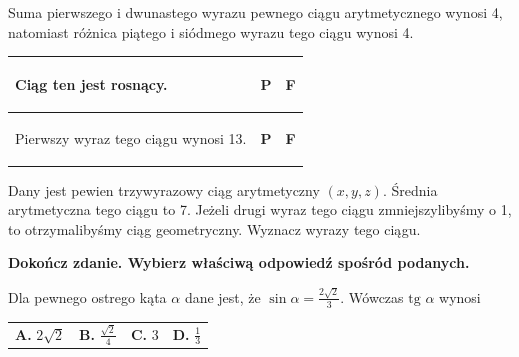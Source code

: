 \documentclass[12pt,a4paper]{article}
\theoremstyle{break}
\begin{document}
	Suma pierwszego i dwunastego wyrazu pewnego ciągu arytmetycznego wynosi 4, natomiast różnica piątego i siódmego wyrazu tego ciągu wynosi 4.
	
	\vspace{0.5cm}
	\begin{tabular}{|p{12.5cm}|p{1cm}|p{1cm}|}
		
		\hline
		\begin{flushleft}
			Ciąg ten jest rosnący.
		\end{flushleft}&\begin{center}
			\textbf{P}
		\end{center}&\begin{center}
			\textbf{F}
		\end{center}\\
		\hline
		\begin{flushleft}
			Pierwszy wyraz tego ciągu wynosi 13.
		\end{flushleft}&\begin{center}
			\textbf{P}
		\end{center}&\begin{center}
			\textbf{F}
		\end{center}\\
		\hline
	\end{tabular}
	
	\begin{zad}[0-4]
		Dany jest pewien trzywyrazowy ciąg arytmetyczny $(x,y,z)$. Średnia arytmetyczna tego ciągu to 7. Jeżeli drugi wyraz tego ciągu zmniejszylibyśmy o 1, to otrzymalibyśmy ciąg geometryczny. Wyznacz wyrazy tego ciągu.
	\end{zad} 

	
	\begin{zad}[0-1]
		\textbf{Dokończ zdanie. Wybierz właściwą odpowiedź spośród podanych.}
	\end{zad} 
	
	Dla pewnego ostrego kąta $\alpha$ dane jest, że $\sin\alpha = \frac{2\sqrt{2}}{3}$. Wówczas $\text{tg }\alpha$ wynosi
	
	\vspace{0.5cm}
	\begin{tabular}{p{3.5cm} p{3.5cm} p{3.5cm} p{3.5cm}}
		\textbf{A. }$2\sqrt{2}$&
		\textbf{B. }$\frac{\sqrt{2}}{4}$&
		\textbf{C. }$3$&
		\textbf{D. }$\frac{1}{3}$\\
	\end{tabular}

	\newpage
	
\end{document}
